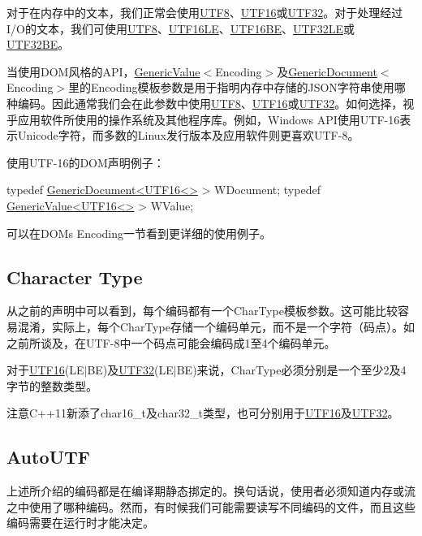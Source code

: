 对于在内存中的文本，我们正常会使用{\ttfamily \hyperlink{struct_u_t_f8}{U\+T\+F8}}、{\ttfamily \hyperlink{struct_u_t_f16}{U\+T\+F16}}或{\ttfamily \hyperlink{struct_u_t_f32}{U\+T\+F32}}。对于处理经过\+I/\+O的文本，我们可使用{\ttfamily \hyperlink{struct_u_t_f8}{U\+T\+F8}}、{\ttfamily \hyperlink{struct_u_t_f16_l_e}{U\+T\+F16\+LE}}、{\ttfamily \hyperlink{struct_u_t_f16_b_e}{U\+T\+F16\+BE}}、{\ttfamily \hyperlink{struct_u_t_f32_l_e}{U\+T\+F32\+LE}}或{\ttfamily \hyperlink{struct_u_t_f32_b_e}{U\+T\+F32\+BE}}。

当使用\+D\+O\+M风格的\+A\+P\+I，{\ttfamily \hyperlink{class_generic_value}{Generic\+Value}$<$Encoding$>$}及{\ttfamily \hyperlink{class_generic_document}{Generic\+Document}$<$Encoding$>$}里的{\ttfamily Encoding}模板参数是用于指明内存中存储的\+J\+S\+O\+N字符串使用哪种编码。因此通常我们会在此参数中使用{\ttfamily \hyperlink{struct_u_t_f8}{U\+T\+F8}}、{\ttfamily \hyperlink{struct_u_t_f16}{U\+T\+F16}}或{\ttfamily \hyperlink{struct_u_t_f32}{U\+T\+F32}}。如何选择，视乎应用软件所使用的操作系统及其他程序库。例如，\+Windows A\+P\+I使用\+U\+T\+F-\/16表示\+Unicode字符，而多数的\+Linux发行版本及应用软件则更喜欢\+U\+T\+F-\/8。

使用\+U\+T\+F-\/16的\+D\+O\+M声明例子：


\begin{DoxyCode}
\textcolor{keyword}{typedef} \hyperlink{class_generic_document}{GenericDocument<UTF16<>} > WDocument;
\textcolor{keyword}{typedef} \hyperlink{class_generic_value}{GenericValue<UTF16<>} > WValue;
\end{DoxyCode}


可以在D\+OM\textquotesingle{}s Encoding一节看到更详细的使用例子。\hypertarget{md_Cadriciel_Commun_Externe_RapidJSON_doc_encoding.zh-cn_CharacterType}{}\subsection{Character Type}\label{md_Cadriciel_Commun_Externe_RapidJSON_doc_encoding.zh-cn_CharacterType}
从之前的声明中可以看到，每个编码都有一个{\ttfamily Char\+Type}模板参数。这可能比较容易混淆，实际上，每个{\ttfamily Char\+Type}存储一个编码单元，而不是一个字符（码点）。如之前所谈及，在\+U\+T\+F-\/8中一个码点可能会编码成1至4个编码单元。

对于{\ttfamily \hyperlink{struct_u_t_f16}{U\+T\+F16}(L\+E$\vert$\+BE)}及{\ttfamily \hyperlink{struct_u_t_f32}{U\+T\+F32}(L\+E$\vert$\+BE)}来说，{\ttfamily Char\+Type}必须分别是一个至少2及4字节的整数类型。

注意\+C++11新添了{\ttfamily char16\+\_\+t}及{\ttfamily char32\+\_\+t}类型，也可分别用于{\ttfamily \hyperlink{struct_u_t_f16}{U\+T\+F16}}及{\ttfamily \hyperlink{struct_u_t_f32}{U\+T\+F32}}。\hypertarget{md_Cadriciel_Commun_Externe_RapidJSON_doc_encoding.zh-cn_AutoUTF}{}\subsection{Auto\+U\+TF}\label{md_Cadriciel_Commun_Externe_RapidJSON_doc_encoding.zh-cn_AutoUTF}
上述所介绍的编码都是在编译期静态挷定的。换句话说，使用者必须知道内存或流之中使用了哪种编码。然而，有时候我们可能需要读写不同编码的文件，而且这些编码需要在运行时才能决定。

